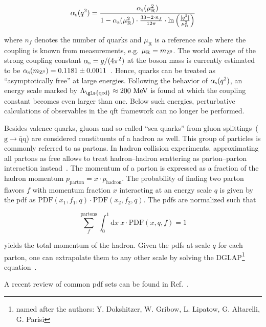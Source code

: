 \begin{equation}
{\alpha_\mathrm{s}}(q^2)=\frac{{\alpha_\mathrm{s}}(\mu_\mathrm{R}^{2})}{1-{\alpha_\mathrm{s}}(\mu_\mathrm{R}^2)\cdot\tfrac{33-2\cdot n_f}{12\pi}\cdot\ln\Big(\tfrac{|q^2|}{\mu_\mathrm{R}^{2}}\Big)}
\end{equation}

where $n_f$ denotes the number of quarks and $\mu_\mathrm{R}$ is a reference scale where the coupling is known from measurements, e.g. $\mu_\mathrm{R}=m_{{\mathrm{Z}^{0}}}$. The world average of the strong coupling constant ${\alpha_\mathrm{s}}=g/(4\pi^2)$ at the \zboson boson mass is currently estimated to be ${\alpha_\mathrm{s}}(m_{{\mathrm{Z}^{0}}})=0.1181\pm0.0011$~\cite{Olive:2016xmw}. Hence, quarks can be treated as ``asymptotically free'' at large energies. Following the behavior of ${\alpha_\mathrm{s}}(q^2)$, an energy scale marked by $\Lambda_\mathrm{\gls{qcd}}\approx 200~\MeV$ is found at which the coupling constant becomes even larger than one. Below such energies, perturbative calculations of observables in the \gls{qft} framework can no longer be performed.


Besides valence quarks, gluons and so-called ``sea quarks'' from gluon splittings~($\mathrm{g}\to\bar{\mathrm{q}}\mathrm{q}$) are considered constituents of a hadron as well. This group of particles is commonly referred to as partons. In hadron collision experiments, approximating all partons as free allows to treat hadron--hadron scattering as parton--parton interaction instead~\cite{Feynman:1969wa}. The momentum of a parton is expressed as a fraction of the hadron momentum $p_\mathrm{parton}=x\cdot p_\mathrm{hadron}$. The probability of 
finding two parton flavors $f$ with momentum fraction $x$ interacting at an energy scale $q$ is given by the \gls{pdf} as $\mathrm{PDF}(x_{1},f_{1},q)\cdot\mathrm{PDF}(x_{2},f_{2},q)$. The \glspl{pdf} are normalized such that

\begin{equation}
\sum_{f}^\mathrm{partons}\int_{0}^{1}\mathrm{d}x~x\cdot \mathrm{PDF}(x,q,f)=1
\end{equation}

yields the total momentum of the hadron. Given the \glspl{pdf} at scale $q$ for each parton, one can extrapolate them to any other scale by solving the DGLAP\footnote{named after the authors: Y. Dokshitzer, W. Gribow, L. Lipatow, G. Altarelli, G. Parisi} equation~\cite{Dokshitzer:1977sg,Gribov:1972ri,Altarelli:1977zs}.

A recent review of common \gls{pdf} sets can be found in Ref.~\cite{Accardi2016}.


